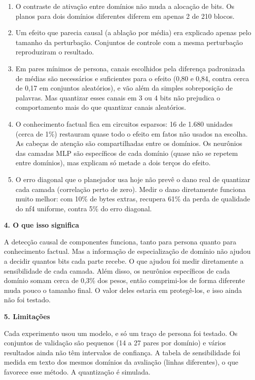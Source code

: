 \documentclass[11pt,a4paper]{article}
\newcommand{\secao}[1]{\par\textbf{#1}\par\nopagebreak[4]}
\begin{document}
\begin{enumerate}
\item O contraste de ativação entre domínios não muda a alocação de bits. Os planos para dois domínios diferentes diferem em apenas 2 de 210 blocos.
\item Um efeito que parecia causal (a ablação por média) era explicado apenas pelo tamanho da perturbação. Conjuntos de controle com a mesma perturbação reproduziram o resultado.
\item Em pares mínimos de persona, canais escolhidos pela diferença padronizada de médias são necessários e suficientes para o efeito (0,80 e 0,84, contra cerca de 0,17 em conjuntos aleatórios), e vão além da simples sobreposição de palavras. Mas quantizar esses canais em 3 ou 4 bits não prejudica o comportamento mais do que quantizar canais aleatórios.
\item O conhecimento factual fica em circuitos esparsos: 16 de 1.680 unidades (cerca de 1\%) restauram quase todo o efeito em fatos não usados na escolha. As cabeças de atenção são compartilhadas entre os domínios. Os neurônios das camadas MLP são específicos de cada domínio (quase não se repetem entre domínios), mas explicam só metade a dois terços do efeito.
\item O erro diagonal que o planejador usa hoje não prevê o dano real de quantizar cada camada (correlação perto de zero). Medir o dano diretamente funciona muito melhor: com 10\% de bytes extras, recupera 61\% da perda de qualidade do nf4 uniforme, contra 5\% do erro diagonal.
\end{enumerate}

\secao{4. O que isso significa}

A detecção causal de componentes funciona, tanto para persona quanto para conhecimento factual. Mas a informação de especialização de domínio não ajudou a decidir quantos bits cada parte recebe. O que ajudou foi medir diretamente a sensibilidade de cada camada. Além disso, os neurônios específicos de cada domínio somam cerca de 0,3\% dos pesos, então comprimi-los de forma diferente muda pouco o tamanho final. O valor deles estaria em protegê-los, e isso ainda não foi testado.

\secao{5. Limitações}

Cada experimento usou um modelo, e só um traço de persona foi testado. Os conjuntos de validação são pequenos (14 a 27 pares por domínio) e vários resultados ainda não têm intervalos de confiança. A tabela de sensibilidade foi medida em texto dos mesmos domínios da avaliação (linhas diferentes), o que favorece esse método. A quantização é simulada.
\end{document}
